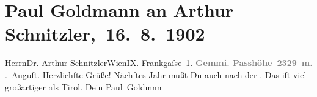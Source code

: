 

         \renewcommand{\erwaehnteOrte}{Orte: Frankgasse 1, Gemmipass, Leukerbad, Schweiz, Südtirol, Tirol, Wien}
         \renewcommand{\erwaehnteWerke}{}
               \section[ Paul Goldmann an Arthur Schnitzler, 16. 8. 1902]{ Paul Goldmann an Arthur Schnitzler, 16. 8. 1902}\nopagebreak{}\rehead{ }\begin{ledgroupsized}[t]{13cm}\normalsize\beginnumbering \toendnotes[C]{\smallbreak\pagebreak[2]} 
\toendnotes[C]{\smallbreak}\pstart{}{\pb}Herrn\pend{}\pstart{}Dr. Arthur Schnitzler\pend{}\pstart{}Wien\pend{}\pstart{}IX. Frankgaſse 1.\pend{}{\bigskip}\pstart
           \noindent{}{\pb}\textcolor{gray}{\textbf{\textbf{Gemmi}. Passhöhe 2329 m.}}\pend
           . Auguſt.\pend
           \pstart
           Herzlichſte Grüße! Nächſtes Jahr mußt Du auch nach der \label{K_L03220-1v}\label{K_L03220-1h}. Das iſt viel
               großartiger \textcolor{gray}{a}ls Tirol.\pend
           \pstart Dein \spacefill\mbox{Paul Goldmnn}\pend{}
         
         \endnumbering{}\end{ledgroupsized}  \newcommand{\dateiname}{L03220}\newcommand{\titel}{Paul Goldmann an Arthur Schnitzler, 16. 8. 1902}\newcommand{\editorInnen}{Martin Anton Müller und Laura Untner}
      